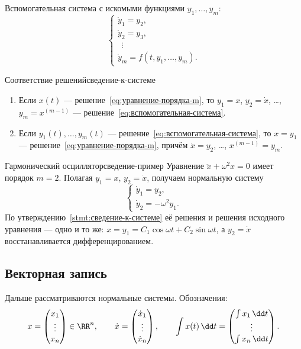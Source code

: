 Вспомогательная система с искомыми функциями $y_1, \dots, y_m$:
\begin{equation}\label{eq:вспомогательная-система}
	\begin{cases}
		\dot y_1 = y_2,\\
		\dot y_2 = y_3,\\
		\ \ \vdots\\
		\dot y_m = f(t, y_1, \dots, y_m).
	\end{cases}
\end{equation}

\begin{Statement}{Соответствие решений}{сведение-к-системе}
	\begin{enumerate}
		\item Если $x(t)$ --- решение~\eqref{eq:уравнение-порядка-m}, то
		$y_1 = x$, $y_2 = \dot x$, \dots, $y_m = x^{(m-1)}$ ---
		решение~\eqref{eq:вспомогательная-система}.
		\item Если $y_1(t), \dots, y_m(t)$ ---
		решение~\eqref{eq:вспомогательная-система}, то $x = y_1$ ---
		решение~\eqref{eq:уравнение-порядка-m}, причём $\dot x = y_2$, \dots,
		$x^{(m-1)} = y_m$.
	\end{enumerate}
\end{Statement}

\begin{Example}[addon]{Гармонический осциллятор}{сведение-пример}
	Уравнение $\ddot x + \omega^2 x = 0$ имеет порядок $m = 2$. Полагая
	$y_1 = x$, $y_2 = \dot x$, получаем нормальную систему
	\[
	\begin{cases}
		\dot y_1 = y_2,\\
		\dot y_2 = -\omega^2 y_1 .
	\end{cases}
	\]
	По утверждению~\ref{stmt:сведение-к-системе} её решения и решения исходного
	уравнения --- одно и то же: $x = y_1 = C_1\cos\omega t + C_2\sin\omega t$, а
	$y_2 = \dot x$ восстанавливается дифференцированием.
\end{Example}

\subsection{Векторная запись}\label{sec:векторная-запись}

Дальше рассматриваются нормальные системы. Обозначения:
\[
x = \begin{pmatrix} x_1 \\ \vdots \\ x_n \end{pmatrix} \in \RR^n,
\qquad
\dot x = \begin{pmatrix} \dot x_1 \\ \vdots \\ \dot x_n \end{pmatrix},
\qquad
\int x(t)\,\dd t
= \begin{pmatrix} \int x_1\,\dd t \\ \vdots \\ \int x_n\,\dd t \end{pmatrix}.
\]

